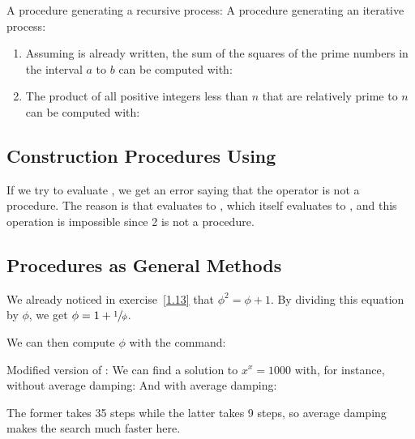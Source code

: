 \begin{exe}[1.33]
    A  procedure generating a recursive process:
    A  procedure generating an iterative process:
    \begin{enumerate}
        \item Assuming  is already written, the sum of the squares 
            of the prime numbers in the interval $a$ to $b$ can be computed 
            with:
        \item The product of all positive integers less than $n$ that are 
            relatively prime to $n$ can be computed with:
    \end{enumerate}
\end{exe}

\subsection{Construction Procedures Using }

\begin{exe}[1.34]
    If we try to evaluate , we get an error saying that the operator 
    is not a procedure. The reason is that  evaluates to
    , which itself evaluates to , and this operation is 
    impossible since 2 is not a procedure.
\end{exe}

\subsection{Procedures as General Methods}
\label{1.3.3}

\begin{exe}[1.35]
    We already noticed in exercise~\ref{1.13} that $\phi^2 = \phi + 1$. By 
    dividing this equation by $\phi$, we get $\phi = 1 + \sfrac{1}{\phi}$.

    We can then compute $\phi$ with the command:
\end{exe}

\begin{exe}[1.36]
    Modified version of :
    We can find a solution to $x^x = 1000$ with, for instance, without average 
    damping:
    And with average damping:

    The former takes 35 steps while the latter takes 9 steps, so average damping 
    makes the search much faster here.
\end{exe}

